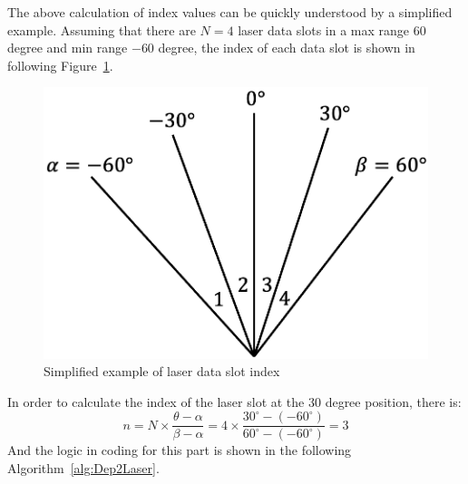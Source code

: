 The above calculation of index values can be quickly understood by a simplified example. 
Assuming that there are $N=4$ laser data slots in a max range $60$ degree and min range $-60$ degree, 
the index of each data slot is shown in following Figure~\ref{fig:laser_index}.

\begin{figure}[H]
    \centering
    \includegraphics[width=0.6\linewidth]{figs/index.png}
    \caption{Simplified example of laser data slot index}
    \label{fig:laser_index}
\end{figure}
In order to calculate the index of the laser slot at the 30 degree position, there is: 
\begin{equation*}
    n=N\times\frac{\theta-\alpha}{\beta-\alpha}=4\times\frac{30^\circ-(-60^\circ)}{60^\circ-(-60^\circ) }=3
\end{equation*}
And the logic in coding for this part is shown in the following Algorithm~\ref{alg:Dep2Laser}.
